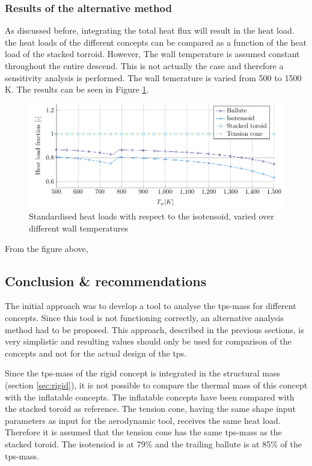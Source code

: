 \subsubsection{Results of the alternative method}
As discussed before, integrating the total heat flux will result in the heat load. the heat loads of the different concepts can be compared as a function of the heat load of the stacked torroid. However, The wall temperature is assumed constant throughout the entire descend. This is not actually the case and therefore a sensitivity analysis is performed. The wall temerature is varied from 500 to 1500 K. The results can be seen in Figure \ref{fig:heatload}.

\begin{figure}[H]
	\centering
	\includegraphics{Figure/heatload.pdf}
	\caption{Standardised heat loads with respect to the isotensoid, varied over different wall temperatures}
	\label{fig:heatload}
\end{figure}

From the figure above, 

\subsection{Conclusion \& recommendations}
The initial approach was to develop a tool to analyse the \gls{tps}-mass for different concepts. Since this tool is not functioning correctly, an alternative analysis method had to be proposed. This approach, described in the previous sections, is very simplistic and resulting values should only be used for comparison of the concepts and not for the actual design of the \gls{tps}.

Since the \gls{tps}-mass of the rigid concept is integrated in the structural mass (section \ref{sec:rigid}), it is not possible to compare the thermal mass of this concept with the inflatable concepts. The inflatable concepts have been compared with the stacked toroid as reference. The tension cone, having the same shape input parameters as input for the aerodynamic tool, receives the same heat load. Therefore it is assumed that the tension cone has the same \gls{tps}-mass as the stacked toroid. The isotensiod is at 79\% and the trailing ballute is at 85\% of the \gls{tps}-mass.

